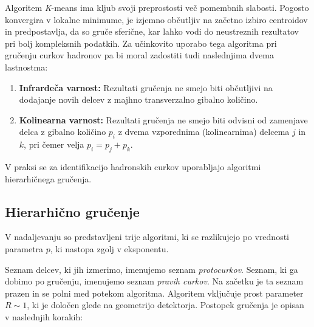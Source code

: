 \documentclass[slovene,11pt,a4paper]{article}
\begin{document}
Algoritem \textit{K}-means ima kljub svoji preprostosti več pomembnih slabosti. Pogosto konvergira v lokalne minimume, je izjemno občutljiv na začetno izbiro centroidov in predpostavlja, da so gruče sferične, kar lahko vodi do neustreznih rezultatov pri bolj kompleksnih podatkih. Za učinkovito uporabo tega algoritma pri gručenju curkov hadronov pa bi moral zadostiti tudi naslednjima dvema lastnostma:



\begin{enumerate}
	\item \textbf{Infrardeča varnost:} Rezultati gručenja ne smejo biti občutljivi na dodajanje novih delcev z majhno transverzalno gibalno količino.
	\item \textbf{Kolinearna varnost:} Rezultati gručenja ne smejo biti odvisni od zamenjave delca z gibalno količino $p_i$ z dvema vzporednima (kolinearnima) delcema $j$ in $k$, pri čemer velja $p_i = p_j + p_k$.
\end{enumerate}

V praksi se za identifikacijo hadronskih curkov uporabljajo algoritmi hierarhičnega gručenja.




\subsection*{Hierarhično gručenje}

V nadaljevanju so predstavljeni trije algoritmi, ki se razlikujejo po vrednosti parametra $p$, ki nastopa zgolj v eksponentu. 

Seznam delcev, ki jih izmerimo, imenujemo seznam \textit{protocurkov}. Seznam, ki ga dobimo po gručenju, imenujemo seznam \textit{pravih curkov}. Na začetku je ta seznam prazen in se polni med potekom algoritma. Algoritem vključuje prost parameter $R \sim 1$, ki je določen glede na geometrijo detektorja. Postopek gručenja je opisan v naslednjih korakih:
\end{document}
